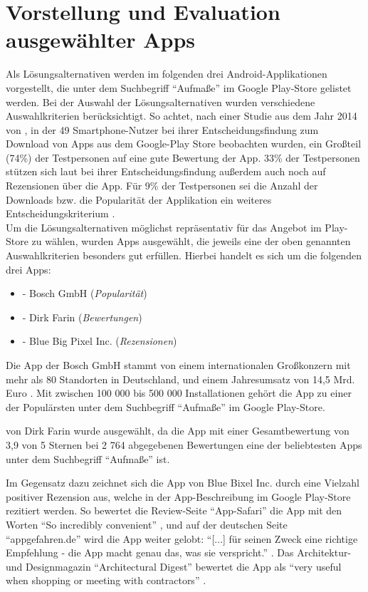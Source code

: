 \section{Vorstellung und Evaluation ausgewählter Apps}\label{sec:evaluation}
Als Lösungsalternativen werden im folgenden drei Android-Applikationen vorgestellt, die unter dem Suchbegriff ``Aufmaße'' im Google Play-Store gelistet werden.
Bei der Auswahl der Lösungsalternativen wurden verschiedene Auswahlkriterien berücksichtigt.
So achtet, nach einer Studie aus dem Jahr 2014 von \citeauthor{Dogruel14}, in der 49 Smartphone-Nutzer bei ihrer Entscheidungsfindung zum Download von Apps aus dem Google-Play Store beobachten wurden, ein Großteil (74\%) der Testpersonen auf eine gute Bewertung der App.
33\% der Testpersonen stützen sich laut \citeauthor{Dogruel14} bei ihrer Entscheidungsfindung außerdem auch noch auf Rezensionen über die App.
Für 9\% der Testpersonen sei die Anzahl der Downloads bzw. die Popularität der Applikation ein weiteres Entscheidungskriterium \citep{Dogruel14}. \\

Um die Lösungsalternativen möglichst repräsentativ für das Angebot im Play-Store zu wählen, wurden Apps ausgewählt, die jeweils eine der oben genannten Auswahlkriterien besonders gut erfüllen.
Hierbei handelt es sich um die folgenden drei Apps:

\begin{itemize}
  \item \mm{} - Bosch GmbH (\textit{Popularität})
  \item \im{} - Dirk Farin (\textit{Bewertungen})
  \item \pm{} - Blue Big Pixel Inc. (\textit{Rezensionen})
\end{itemize}

\noindent
Die App \mm{} der Bosch GmbH stammt von einem internationalen Großkonzern mit mehr als 80 Standorten in Deutschland, und einem Jahresumsatz von 14,5 Mrd. Euro \citep{Bosch18}.
Mit zwischen 100 000 bis 500 000 Installationen gehört die App zu einer der Populärsten unter dem Suchbegriff ``Aufmaße'' im Google Play-Store.

\im{} von Dirk Farin wurde ausgewählt, da die App mit einer Gesamtbewertung von 3,9 von 5 Sternen bei 2 764 abgegebenen Bewertungen eine der beliebtesten Apps unter dem Suchbegriff ``Aufmaße'' ist.

Im Gegensatz dazu zeichnet sich die App \pm{} von Blue Bixel Inc. durch eine Vielzahl positiver Rezension aus, welche in der App-Beschreibung im Google Play-Store rezitiert werden.
So bewertet die Review-Seite ``App-Safari'' die App mit den Worten ``So incredibly convenient'' \citep{AppSafari18}, und auf der deutschen Seite ``appgefahren.de'' wird die App weiter gelobt:
``[...] für seinen Zweck eine richtige Empfehlung - die App macht genau das, was sie verspricht.'' \citep{Appgefahren18}.
Das Architektur- und Designmagazin ``Architectural Digest'' bewertet die App als ``very useful when shopping or meeting with contractors'' \citep{Architekt18}. \\

